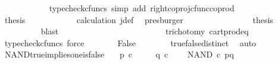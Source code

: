 \begin{isabellebody}
\ \ \ \ \ \ \ \ \ \ \isamarkupfalse%
\ {\isacharparenleft}{\kern0pt}typecheck{\isacharunderscore}{\kern0pt}cfuncs{\isacharcomma}{\kern0pt}\ simp\ add{\isacharcolon}{\kern0pt}\ right{\isacharunderscore}{\kern0pt}coproj{\isacharunderscore}{\kern0pt}cfunc{\isacharunderscore}{\kern0pt}coprod{\isacharparenright}{\kern0pt}\isanewline
\ \ \ \ \ \ \ \ \isamarkupfalse%
\ \isamarkupfalse%
\ {\isacharquery}{\kern0pt}thesis\isanewline
\ \ \ \ \ \ \ \ \ \ \isamarkupfalse%
\ calculation\ j{\isacharunderscore}{\kern0pt}def\ \isamarkupfalse%
\ presburger\isanewline
\ \ \ \ \ \ \isamarkupfalse%
\isanewline
\ \ \ \ \ \ \isamarkupfalse%
\ \isamarkupfalse%
\ {\isacharquery}{\kern0pt}thesis\isanewline
\ \ \ \ \ \ \ \ \isamarkupfalse%
\ blast\isanewline
\ \ \ \ \isamarkupfalse%
\isanewline
\ \ \isamarkupfalse%
\isanewline
\ \ \ \ \isamarkupfalse%
\ \isamarkupfalse%
\ {\isachardoublequoteopen}{\isasymt}\ {\isacharequal}{\kern0pt}\ {\isasymf}{\isachardoublequoteclose}\isanewline
\ \ \ \ \ \ \isamarkupfalse%
\ trichotomy\ cart{\isacharunderscore}{\kern0pt}prod{\isacharunderscore}{\kern0pt}eq{}\ \isamarkupfalse%
\ {\isacharparenleft}{\kern0pt}typecheck{\isacharunderscore}{\kern0pt}cfuncs{\isacharcomma}{\kern0pt}\ force{\isacharparenright}{\kern0pt}\isanewline
\ \ \ \ \isamarkupfalse%
\ \isamarkupfalse%
\ False\isanewline
\ \ \ \ \ \ \isamarkupfalse%
\ true{\isacharunderscore}{\kern0pt}false{\isacharunderscore}{\kern0pt}distinct\ \isamarkupfalse%
\ auto\ \ \isanewline
{}\isamarkupfalse%
%
\endisatagproof
{\isafoldproof}%
%
\isadelimproof
\isanewline
%
\endisadelimproof
\isanewline
{}\isamarkupfalse%
\ NAND{\isacharunderscore}{\kern0pt}true{\isacharunderscore}{\kern0pt}implies{\isacharunderscore}{\kern0pt}one{\isacharunderscore}{\kern0pt}is{\isacharunderscore}{\kern0pt}false{\isacharcolon}{\kern0pt}\isanewline
\ \ \ {\isachardoublequoteopen}p\ {\isasymin}\isactrlsub c\ {\isasymOmega}{\isachardoublequoteclose}\ \isanewline
\ \ \ {\isachardoublequoteopen}q\ {\isasymin}\isactrlsub c\ {\isasymOmega}{\isachardoublequoteclose}\isanewline
\ \ \ {\isachardoublequoteopen}NAND\ {\isasymcirc}\isactrlsub c\ {\isasymlangle}p{\isacharcomma}{\kern0pt}q{\isasymrangle}\ {\isacharequal}{\kern0pt}\ {\isasymt}{\isachardoublequoteclose}\isanewline

\end{isabellebody}
